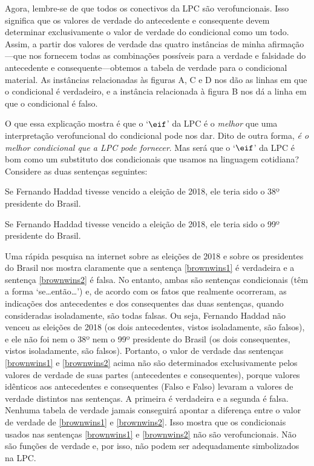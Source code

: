 Agora, lembre-se de que todos os conectivos da LPC são verofuncionais. Isso significa que os valores de verdade do antecedente e consequente devem determinar exclusivamente o valor de verdade do condicional como um todo.
Assim, a partir dos valores de verdade das quatro instâncias de minha afirmação---que nos fornecem todas as combinações possíveis para a verdade e falsidade do antecedente e consequente---obtemos a tabela de verdade para o condicional material.
As instâncias relacionadas às figuras A, C e D nos dão as linhas em que o condicional é verdadeiro, e a instância relacionada à figura B nos dá a linha em que o condicional é falso.

O que essa explicação mostra é que o `$\eif$' da LPC é o \emph{melhor} que uma interpretação verofuncional do condicional pode nos dar.
Dito de outra forma, \emph{é o melhor condicional que a LPC pode fornecer}.
Mas será que o `$\eif$' da LPC é bom como um substituto dos condicionais que usamos na linguagem cotidiana?
Considere as duas sentenças seguintes:
	\begin{earg}
		\item[\ex{brownwins1}] Se Fernando Haddad tivesse vencido a eleição de 2018, ele teria sido o 38º  presidente do Brasil.
		\item[\ex{brownwins2}] Se Fernando Haddad tivesse vencido a eleição de 2018, ele teria sido o 99º presidente do Brasil.
	\end{earg}
Uma rápida pesquisa na internet sobre as eleições de 2018 e sobre os presidentes do Brasil nos mostra claramente que a sentença \ref{brownwins1} é verdadeira e a sentença \ref{brownwins2} é falsa.
No entanto, ambas são sentenças condicionais (têm a forma `se\ldots então\ldots') e, de acordo com os fatos que realmente ocorreram, as indicações dos antecedentes e dos consequentes das duas sentenças, quando consideradas isoladamente, são todas falsas.
Ou seja, Fernando Haddad não venceu as eleições de 2018 (os dois antecedentes, vistos isoladamente, são falsos), e ele não foi nem o 38º nem o 99º presidente do Brasil (os dois consequentes, vistos isoladamente, são falsos).
Portanto, o valor de verdade das sentenças \ref{brownwins1} e \ref{brownwins2} acima não são determinados  exclusivamente pelos valores de verdade de suas partes (antecedentes e consequentes),
porque valores idênticos aos antecedentes e consequentes (Falso e Falso) levaram a valores de verdade distintos nas sentenças.
A primeira é verdadeira e a segunda é falsa.
Nenhuma tabela de verdade jamais conseguirá apontar a diferença entre o valor de verdade de \ref{brownwins1} e \ref{brownwins2}.
Isso mostra que os condicionais usados nas sentenças \ref{brownwins1} e \ref{brownwins2} não são verofuncionais.
Não são funções de verdade e, por isso, não podem ser adequadamente simbolizados na LPC.

